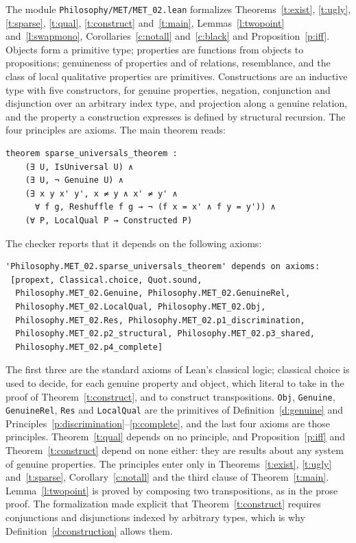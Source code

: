 \documentclass{situationist-preprint}
\begin{document}
The module \nolinkurl{Philosophy/MET/MET_02.lean} formalizes Theorems~\ref{t:exist}, \ref{t:ugly}, \ref{t:sparse}, \ref{t:qual}, \ref{t:construct} and~\ref{t:main}, Lemmas~\ref{l:twopoint} and~\ref{l:swapmono}, Corollaries~\ref{c:notall} and~\ref{c:black} and Proposition~\ref{p:iff}. Objects form a primitive type; properties are functions from objects to propositions; genuineness of properties and of relations, resemblance, and the class of local qualitative properties are primitives. Constructions are an inductive type with five constructors, for genuine properties, negation, conjunction and disjunction over an arbitrary index type, and projection along a genuine relation, and the property a construction expresses is defined by structural recursion. The four principles are axioms. The main theorem reads:

\begin{lstlisting}
theorem sparse_universals_theorem :
    (∃ U, IsUniversal U) ∧
    (∃ U, ¬ Genuine U) ∧
    (∃ x y x' y', x ≠ y ∧ x' ≠ y' ∧
      ∀ f g, Reshuffle f g → ¬ (f x = x' ∧ f y = y')) ∧
    (∀ P, LocalQual P → Constructed P)
\end{lstlisting}

The checker reports that it depends on the following axioms:

\begin{lstlisting}
'Philosophy.MET_02.sparse_universals_theorem' depends on axioms:
 [propext, Classical.choice, Quot.sound,
  Philosophy.MET_02.Genuine, Philosophy.MET_02.GenuineRel,
  Philosophy.MET_02.LocalQual, Philosophy.MET_02.Obj,
  Philosophy.MET_02.Res, Philosophy.MET_02.p1_discrimination,
  Philosophy.MET_02.p2_structural, Philosophy.MET_02.p3_shared,
  Philosophy.MET_02.p4_complete]
\end{lstlisting}

The first three are the standard axioms of Lean's classical logic; classical choice is used to decide, for each genuine property and object, which literal to take in the proof of Theorem~\ref{t:construct}, and to construct transpositions. \texttt{Obj}, \texttt{Genuine}, \texttt{GenuineRel}, \texttt{Res} and \texttt{LocalQual} are the primitives of Definition~\ref{d:genuine} and Principles~\ref{p:discrimination}--\ref{p:complete}, and the last four axioms are those principles. Theorem~\ref{t:qual} depends on no principle, and Proposition~\ref{p:iff} and Theorem~\ref{t:construct} depend on none either: they are results about any system of genuine properties. The principles enter only in Theorems~\ref{t:exist}, \ref{t:ugly} and~\ref{t:sparse}, Corollary~\ref{c:notall} and the third clause of Theorem~\ref{t:main}. Lemma~\ref{l:twopoint} is proved by composing two transpositions, as in the prose proof. The formalization made explicit that Theorem~\ref{t:construct} requires conjunctions and disjunctions indexed by arbitrary types, which is why Definition~\ref{d:construction} allows them.
\end{document}
